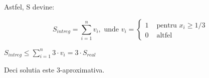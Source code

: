 \documentclass[a4paper]{article}
\begin{document}
\begin{flushleft}
Astfel, S devine:

\begin{center}

\begin{equation}
 S_{intreg} = \sum_{i=1}^{n} v_{i}, \text{ unde } v_{i} = 
  \begin{cases}
  1 & \text{ pentru } x_{i} \geq 1/3 \\
  0 & \text{ altfel }
  \end{cases}
\end{equation}

$S_{intreg} \leq \sum_{i=1}^{n} 3 \cdot v_{i} = 3 \cdot S_{real}$
\end{center}

Deci solutia este 3-aproximativa.

\end{flushleft}
\end{document}

